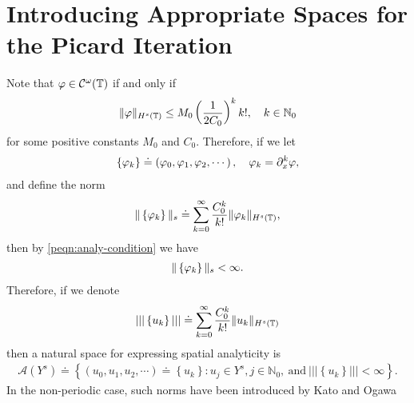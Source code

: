 \section{Introducing Appropriate Spaces for the Picard Iteration}
\label{psec:picard-spaces}
Note that $\varphi \in
\mathcal{C}^{\omega}(\mathbb{T})$ if and only if
%
%
\begin{equation}
\begin{split}
  \|\varphi \|_{H^s(\mathbb{T})} \le M_{0} \left( \frac{1}{2 C_0} \right)^{k} k!, \quad k
  \in \mathbb{N}_0
  \label{peqn:analy-condition}
\end{split}
\end{equation}
%
%
for some positive constants $M_0$ and $C_0$. Therefore, if we let
%
%
\begin{equation*}
\begin{split}
  \left\{ \varphi_k \right\} \doteq \left( \varphi_{0}, \varphi_{1}, \varphi_{2}, \cdots
  \right), \quad \varphi_k = \partial_x^k \varphi,
\end{split}
\end{equation*}
%
%
and define the norm
%
%
\begin{equation*}
\begin{split}
  \|\left\{ \varphi_k \right\} \|_{s} \doteq \sum_{k=0}^\infty \frac{C_0^k}{k!}
  \|\varphi_k \|_{H^s(\mathbb{T})},
\end{split}
\end{equation*}
%
%
then by \eqref{peqn:analy-condition} we have
%
%
\begin{equation*}
\begin{split}
  \|\left\{ \varphi_k \right\} \|_s < \infty.
\end{split}
\end{equation*}
%
%
Therefore, if we denote 
%
%
\begin{equation*}
\begin{split}
  | | |\left\{ u_k \right\} | | | \doteq \sum_{k=0}^\infty \frac{C_0^k}{k!}
  \|u_k \|_{H^s(\mathbb{T})}
\end{split}
\end{equation*}
%
%
then a natural space for expressing spatial analyticity is
%
%
\begin{equation*}
\begin{split}
  \mathcal{A}(Y^s) \doteq \left\{ (u_0, u_1, u_2, \cdots ) \doteq \left\{ u_k
  \right\}: u_j \in Y^s, j \in \mathbb{N}_0, \ \text{and}\ | | |\left\{ u_k
  \right\} | | | < \infty \right\}.
\end{split}
\end{equation*}
%
%
In the non-periodic case, such norms have been introduced by Kato and Ogawa
